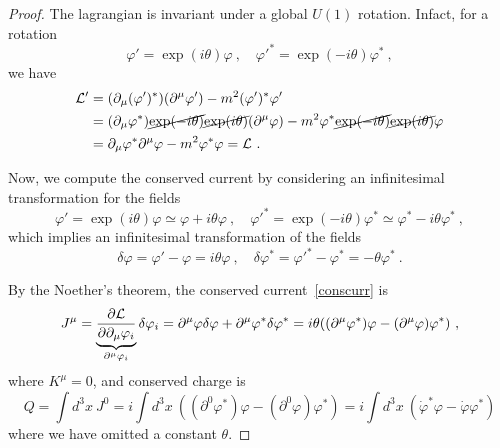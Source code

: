     \begin{proof}
        The lagrangian is invariant under a global $U(1)$ rotation. Infact, for a rotation 
        \begin{equation*}
            \varphi' = \exp(i \theta) \varphi ~, \quad {\varphi'}^* = \exp(- i \theta) \varphi^* ~,
        \end{equation*}
        we have 
        \begin{equation*}
        \begin{aligned}
            \mathcal L' & = (\partial_\mu (\varphi')^*) (\partial^\mu \varphi') - m^2 (\varphi')^* \varphi' \\ & = (\partial_\mu \varphi^*) \cancel{\exp(- i \theta)} \cancel{\exp(i \theta)} (\partial^\mu \varphi) - m^2 \varphi^* \cancel{\exp(- i \theta)} \cancel{\exp(i \theta)} \varphi \\ & = \partial_\mu \varphi^* \partial^\mu \varphi - m^2 \varphi^* \varphi = \mathcal L ~.
        \end{aligned}
        \end{equation*}
       
        Now, we compute the conserved current by considering an infinitesimal transformation for the fields 
        \begin{equation*}
            \varphi' = \exp(i \theta) \varphi \simeq \varphi + i\theta \varphi ~, \quad {\varphi'}^* = \exp(- i \theta) \varphi^* \simeq \varphi^* - i \theta \varphi^* ~,
        \end{equation*} 
        which implies an infinitesimal transformation of the fields
        \begin{equation*}
            \delta \varphi = {\varphi'} - \varphi = i \theta \varphi ~, \quad \delta \varphi^* = {\varphi'}^* - \varphi^* = - \theta \varphi^* ~.
        \end{equation*}

        By the Noether's theorem, the conserved current~\eqref{conscurr} is 
        \begin{equation*}
            J^\mu = \underbrace{\frac{\partial\mathcal L}{\partial\partial_\mu \varphi_i}}_{\partial^\mu \varphi_i} \delta \varphi_i = \partial^\mu \varphi \delta \varphi + \partial^\mu \varphi^* \delta \varphi^* = i \theta ((\partial^\mu \varphi^*) \varphi - (\partial^\mu \varphi) \varphi^*) ~,
        \end{equation*}
        where $K^\mu = 0$, and conserved charge is 
        \begin{equation*}
            Q = \int d^3 x ~ J^0 = i \int d^3 x ~ ((\partial^0 \varphi^*) \varphi - (\partial^0 \varphi) \varphi^*) = i\int d^3 x ~ (\dot \varphi^* \varphi - \dot \varphi \varphi^*)
        \end{equation*}
        where we have omitted a constant $\theta$. 


\end{proof}
